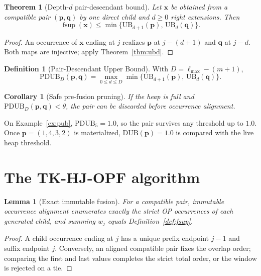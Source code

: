 \documentclass[preprint,12pt]{elsarticle}
\DeclareMathOperator{\fsup}{fsup}
\newcommand{\DUB}{\mathrm{DUB}}
\newcommand{\PDUB}{\mathrm{PDUB}}
\newcommand{\UB}{\mathrm{UB}}
\theoremstyle{plain}
\newtheorem{theorem}{Theorem}
\newtheorem{lemma}{Lemma}
\newtheorem{corollary}{Corollary}
\theoremstyle{definition}
\newtheorem{definition}{Definition}
\theoremstyle{remark}
\begin{document}
\begin{theorem}[Depth-$d$ pair-descendant bound]
\label{thm:pdb}
Let $\mathbf{x}$ be obtained from a compatible pair $(\mathbf{p},\mathbf{q})$ by one direct child and $d\ge 0$ right extensions. Then
\begin{equation}
\label{eq:pdb}
\fsup(\mathbf{x})\le \min\bigl\{\UB_{d+1}(\mathbf{p}),\,\UB_d(\mathbf{q})\bigr\}.
\end{equation}
\end{theorem}
\begin{proof}
An occurrence of $\mathbf{x}$ ending at $j$ realizes $\mathbf{p}$ at $j-(d+1)$ and $\mathbf{q}$ at $j-d$. Both maps are injective; apply Theorem~\ref{thm:ubd}.
\end{proof}

\begin{definition}[Pair-Descendant Upper Bound]
\label{def:pdub}
With $D=\ell_{\max}-(m+1)$,
\begin{equation}
\label{eq:pdub}
\PDUB_D(\mathbf{p},\mathbf{q})
=\max_{0\le d\le D}\min\bigl\{\UB_{d+1}(\mathbf{p}),\,\UB_d(\mathbf{q})\bigr\}.
\end{equation}
\end{definition}

\begin{corollary}[Safe pre-fusion pruning]
\label{cor:pdub}
If the heap is full and $\PDUB_D(\mathbf{p},\mathbf{q})<\theta$, the pair can be discarded before occurrence alignment.
\end{corollary}

On Example~\ref{ex:pub}, $\PDUB_5=1.0$, so the pair survives any threshold up to $1.0$. Once $\mathbf{p}=(1,4,3,2)$ is materialized, $\DUB(\mathbf{p})=1.0$ is compared with the live heap threshold.

\section{The TK-HJ-OPF algorithm}
\label{sec:alg}

\begin{lemma}[Exact immutable fusion]
\label{lem:fusion}
For a compatible pair, immutable occurrence alignment enumerates exactly the strict OP occurrences of each generated child, and summing $w_j$ equals Definition~\ref{def:fsup}.
\end{lemma}
\begin{proof}
A child occurrence ending at $j$ has a unique prefix endpoint $j-1$ and suffix endpoint $j$. Conversely, an aligned compatible pair fixes the overlap order; comparing the first and last values completes the strict total order, or the window is rejected on a tie.
\end{proof}
\end{document}

